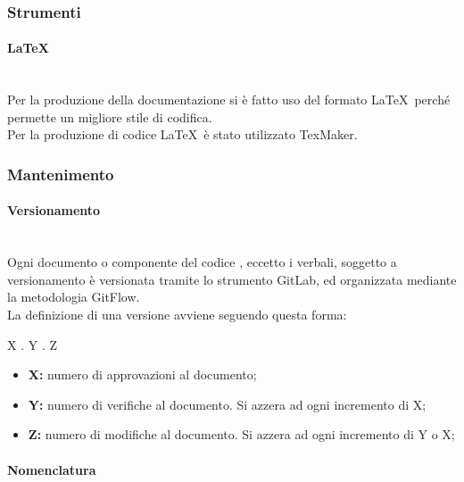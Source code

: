 \documentclass[11pt,a4paper]{article}
\begin{document}
	\subsubsection{Strumenti}
	
	\paragraph{\LaTeX}
	\noindent \\ Per la produzione della documentazione si è fatto uso del formato \LaTeX\ perché permette un migliore stile di codifica.\\
	Per la produzione di codice \LaTeX\ è stato utilizzato TexMaker.
	
	\subsubsection{Mantenimento}
	
	\paragraph{Versionamento}
\noindent \\ Ogni documento o componente del codice , eccetto i verbali, soggetto a versionamento è versionata tramite lo strumento GitLab, ed organizzata mediante la metodologia GitFlow.\\
La definizione di una versione avviene seguendo questa forma:
\begin{center}
	X . Y . Z
\end{center}

\begin{itemize}
	\item \textbf{X:} numero di approvazioni al documento;
	\item \textbf{Y:} numero di verifiche al documento. Si azzera ad ogni incremento di X;
	\item \textbf{Z:} numero di modifiche al documento. Si azzera ad ogni incremento di Y o X;
\end{itemize}

\paragraph{Nomenclatura}
\end{document}
